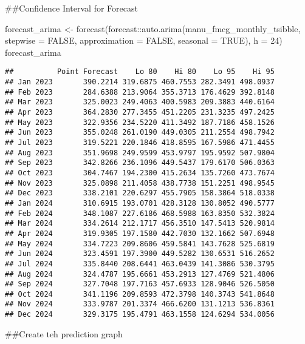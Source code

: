 \documentclass[
]{article}
\newenvironment{Shaded}{\begin{snugshade}}{\end{snugshade}}
\newcommand{\AttributeTok}[1]{\textcolor[rgb]{0.77,0.63,0.00}{#1}}
\newcommand{\ConstantTok}[1]{\textcolor[rgb]{0.00,0.00,0.00}{#1}}
\newcommand{\DecValTok}[1]{\textcolor[rgb]{0.00,0.00,0.81}{#1}}
\newcommand{\FunctionTok}[1]{\textcolor[rgb]{0.00,0.00,0.00}{#1}}
\newcommand{\NormalTok}[1]{#1}
\newcommand{\OtherTok}[1]{\textcolor[rgb]{0.56,0.35,0.01}{#1}}
\newcommand{\SpecialCharTok}[1]{\textcolor[rgb]{0.00,0.00,0.00}{#1}}
\begin{document}
\#\#Confidence Interval for Forecast

\begin{Shaded}
\begin{Highlighting}[]
\NormalTok{forecast\_arima }\OtherTok{\textless{}{-}} \FunctionTok{forecast}\NormalTok{(forecast}\SpecialCharTok{::}\FunctionTok{auto.arima}\NormalTok{(manu\_fmcg\_monthly\_tsibble, }\AttributeTok{stepwise =} \ConstantTok{FALSE}\NormalTok{, }\AttributeTok{approximation =} \ConstantTok{FALSE}\NormalTok{, }\AttributeTok{seasonal =} \ConstantTok{TRUE}\NormalTok{), }\AttributeTok{h =} \DecValTok{24}\NormalTok{)}
\NormalTok{forecast\_arima}
\end{Highlighting}
\end{Shaded}

\begin{verbatim}
##          Point Forecast    Lo 80    Hi 80    Lo 95    Hi 95
## Jan 2023       390.2214 319.6875 460.7553 282.3491 498.0937
## Feb 2023       284.6388 213.9064 355.3713 176.4629 392.8148
## Mar 2023       325.0023 249.4063 400.5983 209.3883 440.6164
## Apr 2023       364.2830 277.3455 451.2205 231.3235 497.2425
## May 2023       322.9356 234.5220 411.3492 187.7186 458.1526
## Jun 2023       355.0248 261.0190 449.0305 211.2554 498.7942
## Jul 2023       319.5221 220.1846 418.8595 167.5986 471.4455
## Aug 2023       351.9698 249.9599 453.9797 195.9592 507.9804
## Sep 2023       342.8266 236.1096 449.5437 179.6170 506.0363
## Oct 2023       304.7467 194.2300 415.2634 135.7260 473.7674
## Nov 2023       325.0898 211.4058 438.7738 151.2251 498.9545
## Dec 2023       338.2101 220.6297 455.7905 158.3864 518.0338
## Jan 2024       310.6915 193.0701 428.3128 130.8052 490.5777
## Feb 2024       348.1087 227.6186 468.5988 163.8350 532.3824
## Mar 2024       334.2614 212.1717 456.3510 147.5413 520.9814
## Apr 2024       319.9305 197.1580 442.7030 132.1662 507.6948
## May 2024       334.7223 209.8606 459.5841 143.7628 525.6819
## Jun 2024       323.4591 197.3900 449.5282 130.6531 516.2652
## Jul 2024       335.8440 208.6441 463.0439 141.3086 530.3795
## Aug 2024       324.4787 195.6661 453.2913 127.4769 521.4806
## Sep 2024       327.7048 197.7163 457.6933 128.9046 526.5050
## Oct 2024       341.1196 209.8593 472.3798 140.3743 541.8648
## Nov 2024       333.9787 201.3374 466.6200 131.1213 536.8361
## Dec 2024       329.3175 195.4791 463.1558 124.6294 534.0056
\end{verbatim}

\#\#Create teh prediction graph
\end{document}
